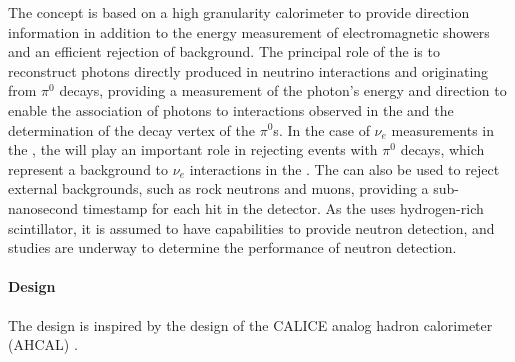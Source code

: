
The   concept is based on a high granularity calorimeter to provide direction information in addition to the energy measurement of electromagnetic showers and an efficient rejection of background. The principal role of the  is to reconstruct photons directly produced in neutrino interactions and originating from $\pi^0$ decays, providing a measurement of the photon's energy and direction to enable the association of photons to interactions observed in the  and the determination of the decay vertex of the $\pi^0$s. In the case of $\nu_e$ measurements in the , the  will play an important role in rejecting events with $\pi^0$ decays, which represent a background to $\nu_e$ interactions in the . The  can also be used to reject external backgrounds, such as rock neutrons and muons, providing a sub-nanosecond timestamp \cite{Simon:2013zya} for each hit in the detector. As the  uses hydrogen-rich scintillator, it is assumed to have capabilities to provide neutron detection, and studies are underway to determine the performance of neutron detection.

\paragraph{ Design}

The  design is inspired by the design of the CALICE analog hadron calorimeter (AHCAL) \cite{collaboration:2010hb}. 

